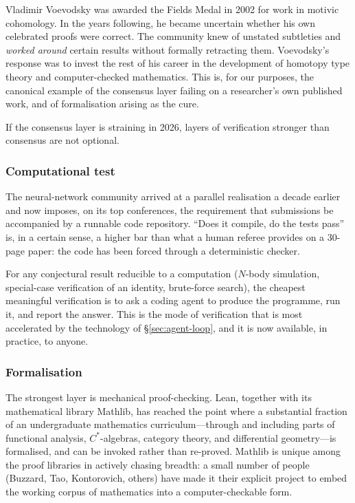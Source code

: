 \begin{historical}
  Vladimir Voevodsky was awarded the Fields Medal in 2002
  for work in motivic cohomology.  In the years following,
  he became uncertain whether his own celebrated proofs
  were correct.  The community knew of unstated subtleties
  and \emph{worked around} certain results without
  formally retracting them.  Voevodsky's response was to
  invest the rest of his career in the development of
  homotopy type theory and computer-checked mathematics.
  This is, for our purposes, the canonical example of the
  consensus layer failing on a researcher's own published
  work, and of formalisation arising as the cure.
\end{historical}

If the consensus layer is straining in 2026, layers of
verification stronger than consensus are not optional.

\subsubsection*{Computational test}

The neural-network community arrived at a parallel
realisation a decade earlier and now imposes, on its top
conferences, the requirement that submissions be accompanied
by a runnable code repository.  ``Does it compile, do the
tests pass'' is, in a certain sense, a higher bar than what a
human referee provides on a $30$-page paper: the code has
been forced through a deterministic checker.

\begin{keyresult}\label{kr:programs}
  For any conjectural result reducible to a computation
  ($N$-body simulation, special-case verification of an
  identity, brute-force search), the cheapest meaningful
  verification is to ask a coding agent to produce the
  programme, run it, and report the answer.  This is the
  mode of verification that is most accelerated by the
  technology of \S\ref{sec:agent-loop}, and it is now
  available, in practice, to anyone.
\end{keyresult}

\subsubsection*{Formalisation}

The strongest layer is mechanical proof-checking.  Lean,
together with its mathematical library Mathlib, has reached
the point where a substantial fraction of an undergraduate
mathematics curriculum---through and including parts of
functional analysis, $C^*$-algebras, category theory, and
differential geometry---is formalised, and can be invoked
rather than re-proved.  Mathlib is unique among the proof
libraries in actively chasing breadth: a small number of
people (Buzzard, Tao, Kontorovich, others) have made it
their explicit project to embed the working corpus of
mathematics into a computer-checkable form.

